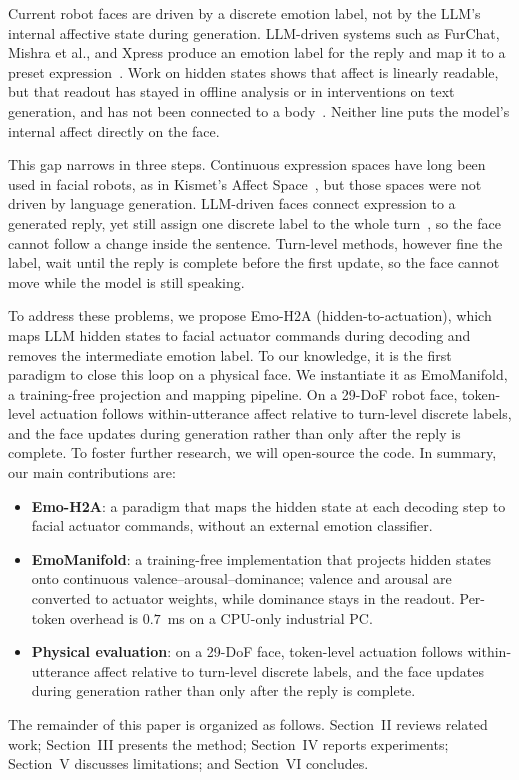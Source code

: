\documentclass[letterpaper, 10 pt, conference]{ieeeconf/ieeeconf}
\begin{document}
Current robot faces are driven by a discrete emotion label, not by the LLM's internal affective state during generation. LLM-driven systems such as FurChat, Mishra et al., and Xpress produce an emotion label for the reply and map it to a preset expression~\cite{cherakara2023furchat,mishra2023realtime,antony2025xpress}. Work on hidden states shows that affect is linearly readable, but that readout has stayed in offline analysis or in interventions on text generation, and has not been connected to a body~\cite{tigges2024sentiment,reichman2026emotions}. Neither line puts the model's internal affect directly on the face.

This gap narrows in three steps. Continuous expression spaces have long been used in facial robots, as in Kismet's Affect Space~\cite{breazeal2002designing}, but those spaces were not driven by language generation. LLM-driven faces connect expression to a generated reply, yet still assign one discrete label to the whole turn~\cite{mishra2023realtime,antony2025xpress}, so the face cannot follow a change inside the sentence. Turn-level methods, however fine the label, wait until the reply is complete before the first update, so the face cannot move while the model is still speaking.

To address these problems, we propose Emo-H2A (hidden-to-actuation), which maps LLM hidden states to facial actuator commands during decoding and removes the intermediate emotion label. To our knowledge, it is the first paradigm to close this loop on a physical face. We instantiate it as EmoManifold, a training-free projection and mapping pipeline. On a 29-DoF robot face, token-level actuation follows within-utterance affect relative to turn-level discrete labels, and the face updates during generation rather than only after the reply is complete. To foster further research, we will open-source the code. In summary, our main contributions are:
\begin{itemize}
\item \textbf{Emo-H2A}: a paradigm that maps the hidden state at each decoding step to facial actuator commands, without an external emotion classifier.
\item \textbf{EmoManifold}: a training-free implementation that projects hidden states onto continuous valence--arousal--dominance; valence and arousal are converted to actuator weights, while dominance stays in the readout. Per-token overhead is $0.7$~ms on a CPU-only industrial PC.
\item \textbf{Physical evaluation}: on a 29-DoF face, token-level actuation follows within-utterance affect relative to turn-level discrete labels, and the face updates during generation rather than only after the reply is complete.
\end{itemize}
The remainder of this paper is organized as follows. Section~II reviews related work; Section~III presents the method; Section~IV reports experiments; Section~V discusses limitations; and Section~VI concludes.
\end{document}
